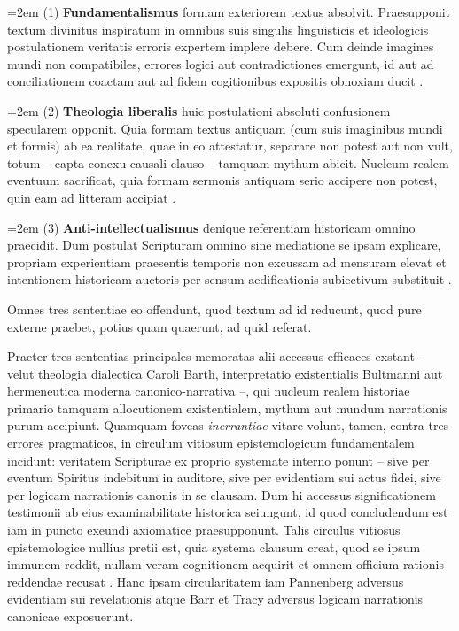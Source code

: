 \documentclass[11pt,a4paper]{article}
\newcommand{\subpar}[1]{%
  \begingroup
  \leftskip=2em %
  \noindent#1\par
  \endgroup
}
\begin{document}
\subpar{(1) \textbf{Fundamentalismus} formam exteriorem textus absolvit. Praesupponit textum divinitus inspiratum in omnibus suis singulis linguisticis et ideologicis postulationem veritatis erroris expertem implere debere. Cum deinde imagines mundi non compatibiles, errores logici aut contradictiones emergunt, id aut ad conciliationem coactam aut ad fidem cogitionibus expositis obnoxiam ducit \citep{barr1977}.}

\subpar{(2) \textbf{Theologia liberalis} huic postulationi absoluti confusionem specularem opponit. Quia formam textus antiquam (cum suis imaginibus mundi et formis) ab ea realitate, quae in eo attestatur, separare non potest aut non vult, totum -- capta conexu causali clauso -- tamquam mythum abicit. Nucleum realem eventuum sacrificat, quia formam sermonis antiquam serio accipere non potest, quin eam ad litteram accipiat \citep{schlatter1905,machen1923}.}

\subpar{(3) \textbf{Anti-intellectualismus} denique referentiam historicam omnino praecidit. Dum postulat Scripturam omnino sine mediatione se ipsam explicare, propriam experientiam praesentis temporis non excussam ad mensuram elevat et intentionem historicam auctoris per sensum aedificationis subiectivum substituit \citep{noll1994}.}

Omnes tres sententiae eo offendunt, quod textum ad id reducunt, quod pure externe praebet, potius quam quaerunt, ad quid referat.

Praeter tres sententias principales memoratas alii accessus efficaces exstant -- velut theologia dialectica Caroli Barth, interpretatio existentialis Bultmanni aut hermeneutica moderna canonico-narrativa \citep{barth1922,bultmann1941,childs1979,frei1974} --, qui nucleum realem historiae primario tamquam allocutionem existentialem, mythum aut mundum narrationis purum accipiunt. Quamquam foveas \textit{inerrantiae} vitare volunt, tamen, contra tres errores pragmaticos, in circulum vitiosum epistemologicum fundamentalem incidunt: veritatem Scripturae ex proprio systemate interno ponunt -- sive per eventum Spiritus indebitum in auditore, sive per evidentiam sui actus fidei, sive per logicam narrationis canonis in se clausam. Dum hi accessus significationem testimonii ab eius examinabilitate historica seiungunt, id quod concludendum est iam in puncto exeundi axiomatice praesupponunt. Talis circulus vitiosus epistemologice nullius pretii est, quia systema clausum creat, quod se ipsum immunem reddit, nullam veram cognitionem acquirit et omnem officium rationis reddendae recusat \citep{popper1963}. Hanc ipsam circularitatem iam Pannenberg \citeyearpar{pannenberg1961,pannenberg1973} adversus evidentiam sui revelationis atque Barr \citeyearpar{barr1983} et Tracy \citeyearpar{tracy1981} adversus logicam narrationis canonicae exposuerunt.
\end{document}
